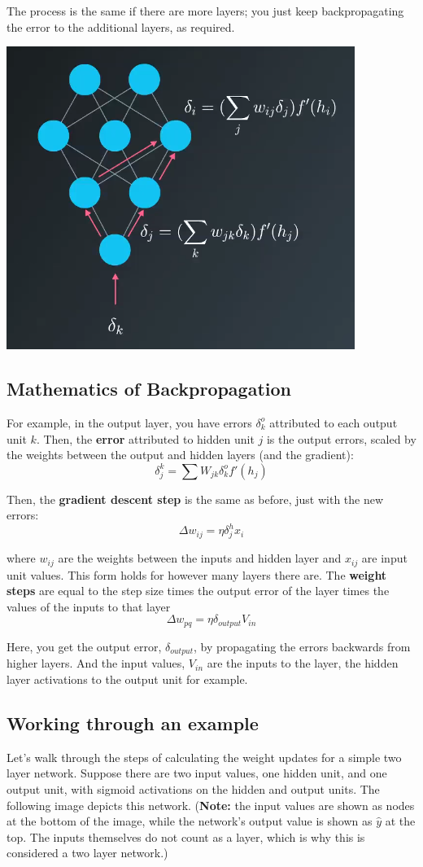 The process is the same if there are more layers; you just keep backpropagating the error to the additional layers, as required.

\includegraphics[width=0.5\linewidth]{img//intro/backpropagation-5.png}

\subsection{Mathematics of Backpropagation}

For example, in the output layer, you have errors \(\delta_k^o\) attributed to each output unit \(k\). Then, the \textbf{error} attributed to hidden unit \(j\) is the output errors, scaled by the weights between the output and hidden layers (and the gradient): \[\delta_j^k = \sum W_{jk} \delta _k^o f'(h_j)\]

Then, the \textbf{gradient descent step} is the same as before, just with the new errors: \[\Delta w_{ij} = \eta \delta_j^h x_i\]

where \(w_{ij}\) are the weights between the inputs and hidden layer and \(x_{ij}\) are input unit values. This form holds for however many layers there are. The \textbf{weight steps} are equal to the step size times the output error of the layer times the values of the inputs to that layer \[\Delta w_{pq} = \eta \delta_{output} V_{in}\]

Here, you get the output error, \(\delta_{output}\), by propagating the errors backwards from higher layers. And the input values, \(V_{in}\) are the inputs to the layer, the hidden layer activations to the output unit for example.

\subsection{Working through an example}

Let's walk through the steps of calculating the weight updates for a simple two layer network. Suppose there are two input values, one hidden unit, and one output unit, with sigmoid activations on the hidden and output units. The following image depicts this network. (\textbf{Note:} the input values are shown as nodes at the bottom of the image, while the network's output value is shown as \(\hat{y}\) at the top. The inputs themselves do not count as a layer, which is why this is considered a two layer network.)


